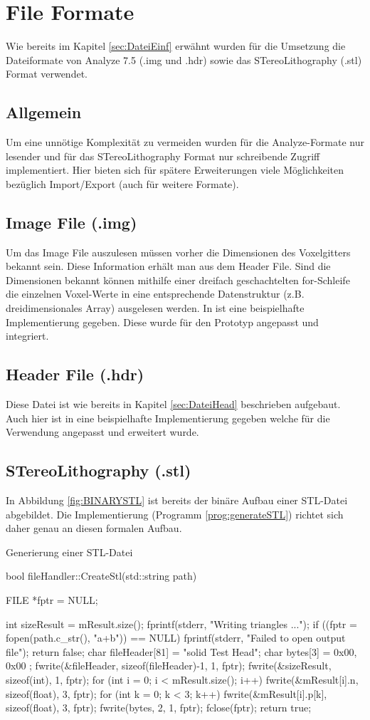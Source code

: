 \section{File Formate}
Wie bereits im Kapitel \ref{sec:DateiEinf} erwähnt wurden für die Umsetzung die Dateiformate von Analyze 7.5 (.img und .hdr) sowie das STereoLithography (.stl) Format verwendet.
\subsection{Allgemein}
Um eine unnötige Komplexität zu vermeiden wurden für die Analyze-Formate nur lesender und für das STereoLithography Format nur schreibende Zugriff implementiert. Hier bieten sich für spätere Erweiterungen viele Möglichkeiten bezüglich Import/Export (auch für weitere Formate). 
\subsection{Image File (.img)}
Um das Image File auszulesen müssen vorher die Dimensionen des Voxelgitters bekannt sein.  Diese Information erhält man aus dem Header File. Sind die Dimensionen bekannt können mithilfe einer dreifach geschachtelten for-Schleife die einzelnen Voxel-Werte in eine entsprechende Datenstruktur (z.B. dreidimensionales Array) ausgelesen werden. In \citep{AnalyzeFormat} ist eine beispielhafte Implementierung gegeben. Diese wurde für den Prototyp angepasst und integriert.
\subsection{Header File (.hdr)}
Diese Datei ist wie bereits in Kapitel \ref{sec:DateiHead} beschrieben aufgebaut. Auch hier ist in \citep{AnalyzeFormat} eine beispielhafte Implementierung gegeben welche für die Verwendung angepasst und erweitert wurde.
\subsection{STereoLithography (.stl)}
In Abbildung \ref{fig:BINARYSTL} ist bereits der binäre Aufbau einer STL-Datei abgebildet. Die Implementierung (Programm \ref{prog:generateSTL}) richtet sich daher genau an diesen formalen Aufbau.
\begin{program}[H]
	\caption{Generierung einer STL-Datei}
	\label{prog:generateSTL}
	\begin{CCode}
		bool fileHandler::CreateStl(std::string path){
			FILE *fptr = NULL;
	
			int sizeResult = mResult.size();
			fprintf(stderr, "Writing triangles ...\n");
			if ((fptr = fopen(path.c_str(), "a+b")) == NULL) {
				fprintf(stderr, "Failed to open output file\n");
				return false;
			}
			char fileHeader[81] = "solid Test Head";
			char bytes[3] = { 0x00, 0x00 };
			fwrite(&fileHeader, sizeof(fileHeader)-1, 1, fptr);
			fwrite(&sizeResult, sizeof(int), 1, fptr);
			for (int i = 0; i < mResult.size(); i++) {
				fwrite(&mResult[i].n, sizeof(float), 3, fptr);
				for (int k = 0; k < 3; k++)  {
					fwrite(&mResult[i].p[k], sizeof(float), 3, fptr);
				}
				fwrite(bytes, 2, 1, fptr);
			}
			fclose(fptr);
			return true;
		}
	\end{CCode}
\end{program}
